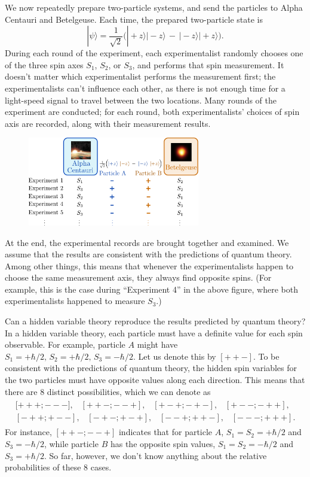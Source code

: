 \documentclass[pra,12pt]{revtex4}
\begin{document}
We now repeatedly prepare two-particle systems, and send the particles
to Alpha Centauri and Betelgeuse.  Each time, the prepared
two-particle state is
\begin{equation}
  |\psi\rangle = \frac{1}{\sqrt{2}} \Big(|\!+\!z\rangle|\!-\!z\rangle \,-\, |\!-\!z\rangle|\!+\!z\rangle\Big).
\end{equation}
During each round of the experiment, each experimentalist randomly
chooses one of the three spin axes $S_1$, $S_2$, or $S_3$, and
performs that spin measurement.  It doesn't matter which
experimentalist performs the measurement first; the experimentalists
can't influence each other, as there is not enough time for a
light-speed signal to travel between the two locations.  Many rounds
of the experiment are conducted; for each round, both
experimentalists' choices of spin axis are recorded, along with their
measurement results.

\begin{figure}[h]
  \centering\includegraphics[width=0.67\textwidth]{bell}
\end{figure}

At the end, the experimental records are brought together and
examined.  We assume that the results are consistent with the
predictions of quantum theory.  Among other things, this means that
whenever the experimentalists happen to choose the same measurement
axis, they always find opposite spins.  (For example, this is the case
during ``Experiment 4'' in the above figure, where both
experimentalists happened to measure $S_3$.)

Can a hidden variable theory reproduce the results predicted by
quantum theory?  In a hidden variable theory, each particle must have
a definite value for each spin observable.  For example, particle $A$
might have $S_1 = +\hbar/2, \, S_2 = +\hbar/2, \, S_3 = -\hbar/2$.
Let us denote this by $[++-]$.  To be consistent with the predictions
of quantum theory, the hidden spin variables for the two particles
must have opposite values along each direction.  This means that there
are $8$ distinct possibilities, which we can denote as
\begin{align*}
  \begin{aligned}{[}{+++};{---}], \;\;\; [{++-};{--+}], \;\;\; [{+-+};{-+-}], \;\;\; [{+--};{-++}],\\ [{-++};{+--}], \;\;\; [{-+-};{+-+}], \;\;\; [{--+};{++-}], \;\;\; [{---};{+++}].\end{aligned}
\end{align*}
For instance, $[{++-};{--+}]$ indicates that for particle $A$, $S_1 =
S_2 = +\hbar/2$ and $S_3 = -\hbar/2$, while particle $B$ has the
opposite spin values, $S_1 = S_2 = -\hbar/2$ and $S_3 = +\hbar/2$.
So far, however, we don't know anything about the relative
probabilities of these 8 cases.
\end{document}
